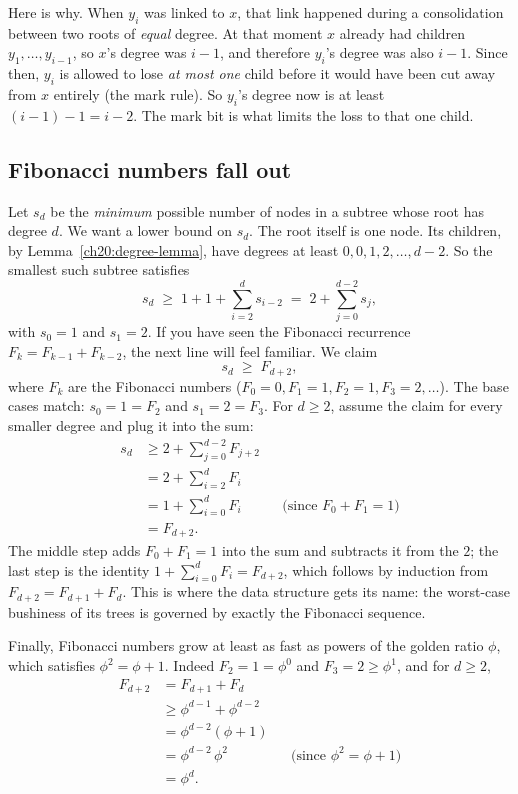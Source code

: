 \begin{intuitionbox}
Here is why. When $y_i$ was linked to $x$, that link happened during a
consolidation between two roots of \emph{equal} degree. At that moment $x$ already
had children $y_1,\ldots,y_{i-1}$, so $x$'s degree was $i-1$, and therefore $y_i$'s
degree was also $i-1$. Since then, $y_i$ is allowed to lose \emph{at most one}
child before it would have been cut away from $x$ entirely (the mark rule). So
$y_i$'s degree now is at least $(i-1) - 1 = i - 2$. The mark bit is what limits
the loss to that one child.
\end{intuitionbox}

\subsection{Fibonacci numbers fall out}

Let $s_d$ be the \emph{minimum} possible number of nodes in a subtree whose root
has degree $d$. We want a lower bound on $s_d$. The root itself is one node. Its
children, by Lemma~\ref{ch20:degree-lemma}, have degrees at least
$0, 0, 1, 2, \ldots, d-2$. So the smallest such subtree satisfies
\[
  s_d \;\ge\; 1 + 1 + \sum_{i=2}^{d} s_{i-2}
       \;=\; 2 + \sum_{j=0}^{d-2} s_j,
\]
with $s_0 = 1$ and $s_1 = 2$. If you have seen the Fibonacci recurrence
$F_{k} = F_{k-1} + F_{k-2}$, the next line will feel familiar. We claim
\[
  s_d \;\ge\; F_{d+2},
\]
where $F_k$ are the Fibonacci numbers ($F_0=0, F_1=1, F_2=1, F_3=2,\ldots$). The
base cases match: $s_0 = 1 = F_2$ and $s_1 = 2 = F_3$. For $d \ge 2$, assume the
claim for every smaller degree and plug it into the sum:
\begin{align*}
  s_d &\ge 2 + \sum_{j=0}^{d-2} F_{j+2} \\
      &= 2 + \sum_{i=2}^{d} F_i \\
      &= 1 + \sum_{i=0}^{d} F_i &&\text{(since } F_0+F_1=1 \text{)} \\
      &= F_{d+2}.
\end{align*}
The middle step adds $F_0 + F_1 = 1$ into the sum and subtracts it from the
$2$; the last step is the identity $1 + \sum_{i=0}^{d} F_i = F_{d+2}$, which
follows by induction from $F_{d+2} = F_{d+1} + F_d$. This
is where the data structure gets its name: the worst-case bushiness of its
trees is governed by exactly the Fibonacci sequence.

Finally, Fibonacci numbers grow at least as fast as powers of the golden ratio $\phi$, which satisfies $\phi^2 = \phi + 1$. Indeed
$F_2 = 1 = \phi^0$ and $F_3 = 2 \ge \phi^1$, and for $d \ge 2$,
\begin{align*}
  F_{d+2} &= F_{d+1} + F_{d} \\
          &\ge \phi^{d-1} + \phi^{d-2} \\
          &= \phi^{d-2}(\phi + 1) \\
          &= \phi^{d-2}\,\phi^2 &&\text{(since } \phi^2=\phi+1 \text{)} \\
          &= \phi^{d}.
\end{align*}

